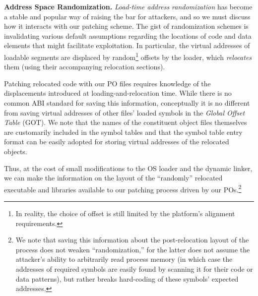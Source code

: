 {\bf Address Space Randomization.}
%
{\em Load-time address randomization} has become a stable and popular
way of raising the bar for attackers, and so we must discuss how it 
interacts with our patching scheme. 
%
The gist of randomization schemes is invalidating various default
assumptions regarding the locations of code and data elements that
might facilitate exploitation.
%
%
%
In particular, the virtual addresses of loadable segments
 are displaced by random\footnote{In reality, the choice of
   offset is still limited by the platform's alignment requirements.}
offsets by the loader, which {\em relocates} them (using their
accompanying relocation sections).

Patching %
relocated code with our PO files requires
knowledge of the displacements introduced at loading-and-relocation
time. While there is no common ABI standard for saving this
information, conceptually it is no different from saving virtual
addresses of other files' loaded symbols in the {\it Global Offset Table}
(GOT). We note that the names of the constituent object files themselves 
are customarily included in the symbol tables and that the symbol
table entry format can be easily adopted for storing virtual addresses
of the %
relocated objects.

Thus, at the cost of small modifications to the OS loader and the 
dynamic linker, we can make the information on the layout of the
``randomly'' relocated executable and libraries available to
our patching process driven by our POs.\footnote{We note that saving 
this information 
%
about the post-relocation layout of the process 
does not weaken ``randomization,'' for 
the latter does not assume the attacker's ability to arbitrarily read 
process memory (in which case the addresses of required symbols are
easily found by scanning it %
for their code or data patterns), 
but rather breaks hard-coding of these symbols' expected addresses.
} 

